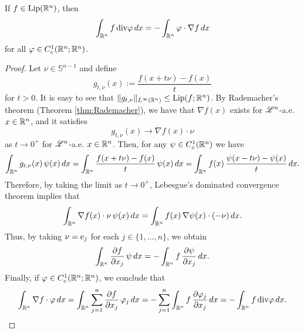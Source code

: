 \begin{proposition} \label{prop:weak_der_Lip_b}
If $f \in \operatorname{Lip}(\mathbb{R}^{n})$, then
\begin{equation} \label{eq:weak_der_Lip_b}
\int_{\mathbb{R}^{n}} f \, \mathrm{div} \varphi \, dx = - \int_{\mathbb{R}^{n}} \varphi \cdot \nabla f \, dx
\end{equation}
for all $\varphi \in C^{1}_{c}(\mathbb{R}^{n}; \mathbb{R}^{n})$.
\end{proposition}
\begin{proof}
Let $\nu \in \mathbb{S}^{n - 1}$ and define
\begin{equation*}
g_{t, \nu}(x) := \frac{f(x + t \nu) -f(x)}{t}
\end{equation*}
for $t > 0$. It is easy to see that $\|g_{t, \nu}\|_{L^{\infty}(\mathbb{R}^{n})} \le \operatorname{Lip}(f; \mathbb{R}^{n})$.
By Rademacher's theorem (Theorem \ref{thm:Rademacher}), we have that $\nabla f(x)$ exists for $\mathscr{L}^{n}$-a.e. $x \in \mathbb{R}^{n}$, and it satisfies
\begin{equation*}
g_{t, \nu}(x) \to \nabla f(x) \cdot \nu
\end{equation*}
as $t \to 0^{+}$ for $\mathscr{L}^{n}$-a.e. $x \in \mathbb{R}^{n}$. Then, for any $\psi \in C^{1}_{c}(\mathbb{R}^{n})$ we have
\begin{equation*}
\int_{\mathbb{R}^{n}} g_{t, \nu}(x) \, \psi(x) \, dx = \int_{\mathbb{R}^{n}} \frac{f(x + t\nu) -f(x)}{t} \, \psi(x) \, dx = \int_{\mathbb{R}^{n}} f(x) \, \frac{\psi(x - t \nu) - \psi(x)}{t} \, dx.
\end{equation*}
Therefore, by taking the limit as $t \to 0^{+}$, Lebesgue's dominated convergence theorem implies that
\begin{equation*}
\int_{\mathbb{R}^{n}} \nabla f(x) \cdot \nu \, \psi(x) \, dx = \int_{\mathbb{R}^{n}} f(x) \, \nabla \psi(x) \cdot (- \nu) \, dx.
\end{equation*}
Thus, by taking $\nu = {\rm e}_{j}$ for each $j \in \{1, \dots, n\}$, we obtain
\begin{equation*}
\int_{\mathbb{R}^{n}} \frac{\partial f}{\partial x_{j}} \, \psi \,dx = - \int_{\mathbb{R}^{n}} f \, \frac{\partial \psi}{\partial x_{j}} \, dx.
\end{equation*}
Finally, if $\varphi \in C^{1}_{c}(\mathbb{R}^{n}; \mathbb{R}^{n})$, we conclude that
\begin{equation*}
\int_{\mathbb{R}^{n}} \nabla f \cdot \varphi \, dx = \int_{\mathbb{R}^{n}} \sum_{j = 1}^{n} \frac{\partial f}{\partial x_{j}} \, \varphi_{j} \,dx = - \sum_{j = 1}^{n} \int_{\mathbb{R}^{n}} f \, \frac{\partial \varphi_{j}}{\partial x_{j}} \, dx = - \int_{\mathbb{R}^{n}} f  \, \mathrm{div} \varphi \, dx.
\end{equation*}
\end{proof}

